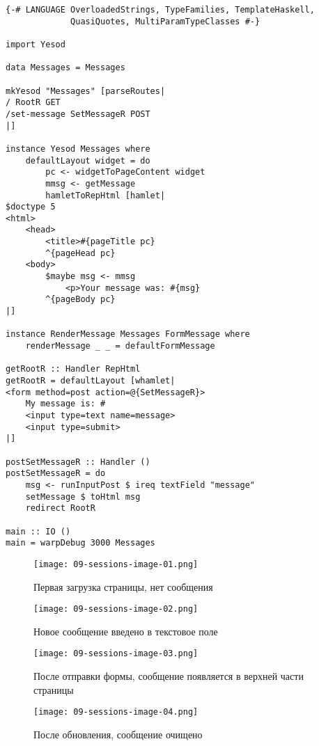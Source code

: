 \begin{lstlisting}
{-# LANGUAGE OverloadedStrings, TypeFamilies, TemplateHaskell,
             QuasiQuotes, MultiParamTypeClasses #-}

import Yesod

data Messages = Messages

mkYesod "Messages" [parseRoutes|
/ RootR GET
/set-message SetMessageR POST
|]

instance Yesod Messages where
    defaultLayout widget = do
        pc <- widgetToPageContent widget
        mmsg <- getMessage
        hamletToRepHtml [hamlet|
$doctype 5
<html>
    <head>
        <title>#{pageTitle pc}
        ^{pageHead pc}
    <body>
        $maybe msg <- mmsg
            <p>Your message was: #{msg}
        ^{pageBody pc}
|]

instance RenderMessage Messages FormMessage where
    renderMessage _ _ = defaultFormMessage

getRootR :: Handler RepHtml
getRootR = defaultLayout [whamlet|
<form method=post action=@{SetMessageR}>
    My message is: #
    <input type=text name=message>
    <input type=submit>
|]

postSetMessageR :: Handler ()
postSetMessageR = do
    msg <- runInputPost $ ireq textField "message"
    setMessage $ toHtml msg
    redirect RootR

main :: IO ()
main = warpDebug 3000 Messages
\end{lstlisting}%

\begin{figure}[tbh]
  \centering
  \texttt{[image: 09-sessions-image-01.png]}
  \caption{Первая загрузка страницы, нет сообщения}
\end{figure}

\begin{figure}[tbh]
  \centering
  \texttt{[image: 09-sessions-image-02.png]}
  \caption{Новое сообщение введено в текстовое поле}
\end{figure}

\begin{figure}[tbh]
  \centering
  \texttt{[image: 09-sessions-image-03.png]}
  \caption{После отправки формы, сообщение появляется в верхней части страницы}
\end{figure}

\begin{figure}[tbh]
  \centering
  \texttt{[image: 09-sessions-image-04.png]}
  \caption{После обновления, сообщение очищено}
\end{figure}

